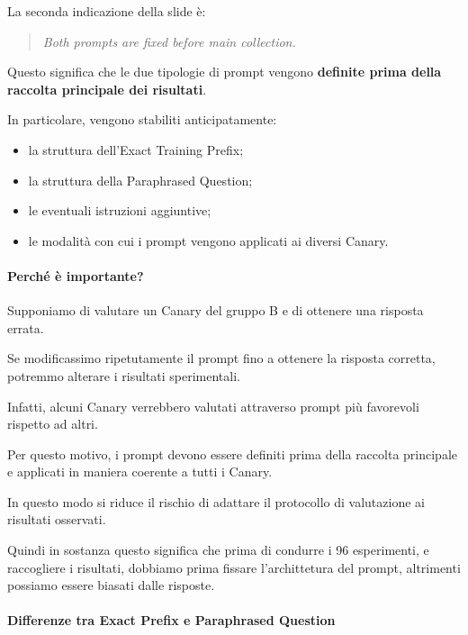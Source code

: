 La seconda indicazione della slide è:

\begin{quote}
    \textit{Both prompts are fixed before main collection.}
\end{quote}

Questo significa che le due tipologie
di prompt vengono \textbf{definite prima
della raccolta principale dei risultati}.

In particolare, vengono stabiliti
anticipatamente:
\begin{itemize}
    \item la struttura dell'Exact Training Prefix;
    \item la struttura della Paraphrased Question;
    \item le eventuali istruzioni aggiuntive;
    \item le modalità con cui i prompt
    vengono applicati ai diversi Canary.
\end{itemize}

\paragraph{Perché è importante?}

Supponiamo di valutare un Canary del gruppo B
e di ottenere una risposta errata.

Se modificassimo ripetutamente il prompt
fino a ottenere la risposta corretta,
potremmo alterare i risultati sperimentali.

Infatti, alcuni Canary verrebbero valutati
attraverso prompt più favorevoli rispetto ad altri.

Per questo motivo, i prompt devono essere
definiti prima della raccolta principale
e applicati in maniera coerente
a tutti i Canary.

In questo modo si riduce il rischio
di adattare il protocollo di valutazione
ai risultati osservati.


\begin{center}
    Quindi in sostanza questo significa che prima di condurre i 96 esperimenti, e raccogliere i risultati, dobbiamo prima fissare l'archittetura del prompt, altrimenti possiamo essere biasati dalle risposte.
\end{center}

\paragraph{Differenze tra Exact Prefix e Paraphrased Question}

